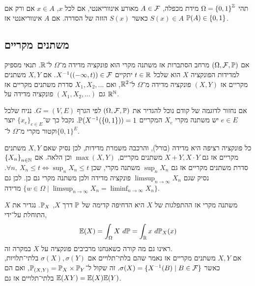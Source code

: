\begin{theorem}
	תהי $\Omega = {\{ 0, 1 \}}^{\mathbb{Z}}$ מידת מכפלה, $A \in \mathcal{F}$ מאורע אינווריאנטי, אם לכל $x$, $x \in A$ אם ורק אם $S(x) \in A$ כאשר $S(x)$ הזזה של הסדרה.
	אם $A$ אינווריאנטי אז $\mathbb{P}(A) \in \{0, 1\}$.
\end{theorem}

\subsection{משתנים מקריים}
אם $(\Omega, \mathcal{F}, \mathbb{P})$ מרחב הסתברות אז משתנה מקרי הוא פונקציה מדידה מ־$\Omega$ ל־$\mathbb{R}$.
תנאי מספיק למדידות הפונקציה $X$ הוא שלכל $t \in \mathbb{R}$ יתקיים $X^{-1}((-\infty, t)) \in \mathcal{F}$.
אם $X, Y$ משתנים מקריים אז $(X, Y)$ פונקציה מדידה מ־$\Omega$ ל־$\mathbb{R}^2$, ואם $X_1, X_2, \ldots$ סדרת משתנים מקריים אז גם $(X_1, X_2, \ldots)$ פונקציה מדידה על $\mathbb{R}^{\mathbb{N}}$.

אם נחזור לדוגמה של קודם נוכל להגדיר את $(\Omega, \mathcal{F}, \mathbb{P})$ לפי הגרף $G = (V, E)$. נניח שלכל $e \in E$ יש משתנה מקרי $X_e$ המקריים $\mathbb{P}(X^{-1}(\{0, 1\})) = 1$.
נקבל כך ש־${\{ x_e \}}_{e \in E}$ יוצר וקטור מקרי מ־$\Omega$ ל־${\{ 0, 1 \}}^E$.
\begin{corollary}
	כל פונקציה רציפה היא מדידה (בורל), והרכבה משמרת מדידות, לכן נסיק שאם $X, Y$ משתנים מקריים אז גם $X + Y, X \cdot Y$ משתנים מקריים, $\max(X, Y)$ וכן הלאה.
	אם ${\{ X_n \}}_{n \in \mathbb{N}}$ סדרת משתנים מקריים אז גם $\sup_n X_n$ משתנה מקרי, שכן $\forall n,\ X_n \le t \iff \sup_n X_n \le t$.
	נסיק שגם $\limsup_{n \to \infty} X_n$ פונקציה מדידה ולכן משתנה מקרי גם כן.
	לכן גם $\{ w \in \Omega \mid \limsup_{n \to \infty} X_n = \liminf_{n \to \infty} X_n \}$ מדידה.
\end{corollary}
$X$ משתנה מקרי אז ההתפלגות של $X$ היא הדחיפה קדימה של $\mathbb{P}$ דרך $X$, $\mathbb{P}_X$.
נגדיר את התוחלת על־ידי,
\[
	\mathbb{E}(X)
	= \int_{\Omega} X\ d\mathbb{P}
	= \int_{\mathbb{R}} x\ d\mathbb{P}_X(x)
\]
ראינו גם מה קורה כשאנחנו מרכיבים פונקציה על $X$ במקרה זה. \\
אם $X, Y$ משתנים מקריים אז נאמר שהם בלתי־תלויים אם $\sigma(X), \sigma(Y)$ בלתי־תלויות, כאשר $\sigma(X) = \{ X^{-1}(B) \mid B \in \mathcal{F} \}$.
זה שקול ל־$\mathbb{P}_{(X, Y)} = \mathbb{P}_X \times \mathbb{P}_Y$, ואם הם בלתי־תלויים אז גם $\mathbb{E}(XY) = \mathbb{E}(X) \mathbb{E}(Y)$.

